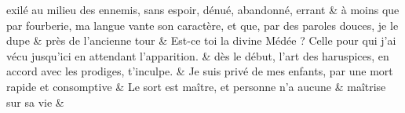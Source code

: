 \documentclass[12pt,onecolumn,twoside,a4paper]{memoir}
\begin{document}
\begin{pairs}
\begin{Rightside}
                         \stanza 
                      exilé au milieu des ennemis, sans espoir, dénué, abandonné,
                              errant \&
                         \stanza 
                      à moins que par fourberie, ma langue vante son caractère, et que, par
                              des paroles douces, je le dupe \&
                         \stanza 
                      près de l’ancienne tour  \&
                         \stanza 
                      Est-ce toi la divine Médée ? Celle pour qui j’ai vécu jusqu’ici en
                              attendant l’apparition.  \&
                         \stanza 
                      dès le début, l’art des haruspices, en accord avec les prodiges,
                              t’inculpe.  \&
                         \stanza 
                      Je suis privé de mes enfants, par une mort rapide et consomptive \&
                         \stanza  Le sort est maître, et personne n’a aucune & 
                      maîtrise sur sa vie \&
                     
                  \endnumbering
		\end{Rightside}
               \end{pairs}
	\Columns
            
            
\end{document}
